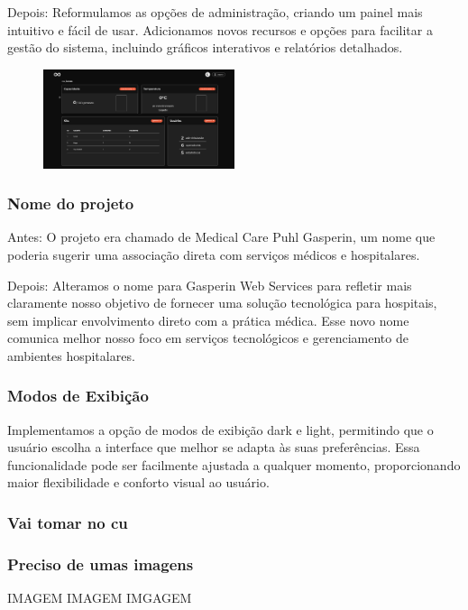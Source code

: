 \documentclass[conference, a4paper, 12pt]{IEEEtran}
\begin{document}
Depois: Reformulamos as opções de administração, criando um painel mais intuitivo e fácil de usar. Adicionamos novos recursos e opções para facilitar a gestão do sistema, incluindo gráficos interativos e relatórios detalhados.
\begin{figure}[h]
  \begin{center}
    \includegraphics[width=0.5\textwidth]{tempo_real_novo.png}
  \end{center}
\end{figure}


\subsubsection{Nome do projeto}

Antes: O projeto era chamado de Medical Care Puhl Gasperin, um nome que poderia sugerir uma associação direta com serviços médicos e hospitalares.

Depois: Alteramos o nome para Gasperin Web Services para refletir mais claramente nosso objetivo de fornecer uma solução tecnológica para hospitais, sem implicar envolvimento direto com a prática médica. Esse novo nome comunica melhor nosso foco em serviços tecnológicos e gerenciamento de ambientes hospitalares.


\subsubsection{Modos de Exibição}

Implementamos a opção de modos de exibição dark e light, permitindo que o usuário escolha a interface que melhor se adapta às suas preferências. Essa funcionalidade pode ser facilmente ajustada a qualquer momento, proporcionando maior flexibilidade e conforto visual ao usuário.
\subsubsection{Vai tomar no cu}
\subsubsection{Preciso de umas imagens}
IMAGEM IMAGEM IMGAGEM
\end{document}
